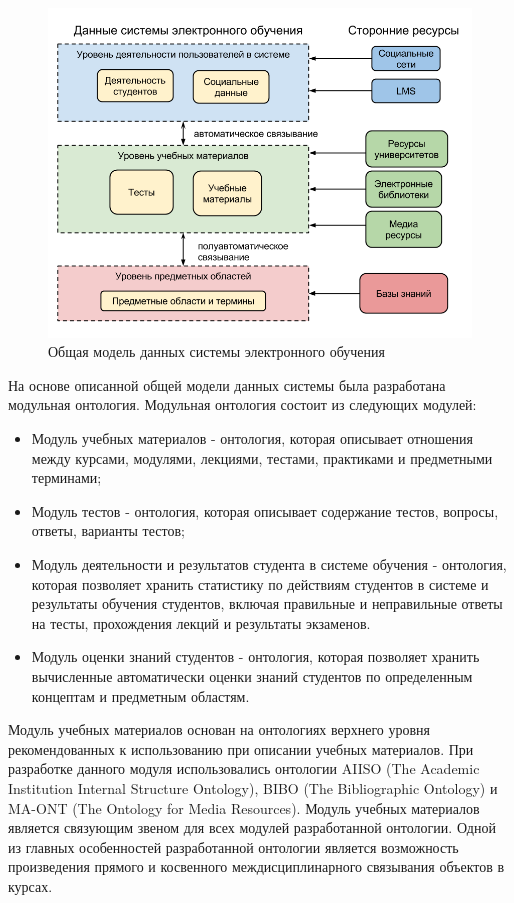 \begin{figure}[ht] 
  \center
  \includegraphics[scale=0.5]{OverallModel}
  \caption{Общая модель данных системы электронного обучения} 
  \label{fig:OverallModel}
\end{figure}

На основе описанной общей модели данных системы была разработана модульная онтология. Модульная онтология состоит из следующих модулей:


\begin{itemize}
\item Модуль учебных материалов - онтология, которая описывает отношения между курсами, модулями, лекциями, тестами, практиками и предметными терминами;
\item Модуль тестов - онтология, которая описывает содержание тестов, вопросы, ответы, варианты тестов;
\item Модуль деятельности и результатов студента в системе обучения - онтология, которая позволяет хранить статистику по действиям студентов в системе и результаты обучения студентов, включая правильные и неправильные ответы на тесты, прохождения лекций и результаты экзаменов.
\item Модуль оценки знаний студентов - онтология, которая позволяет хранить вычисленные автоматически оценки знаний студентов по определенным концептам и предметным областям.
\end{itemize}

Модуль учебных материалов основан на онтологиях верхнего уровня рекомендованных к использованию при описании учебных материалов. При разработке данного модуля использовались онтологии AIISO (The Academic Institution Internal Structure Ontology), BIBO (The Bibliographic Ontology) и MA-ONT (The Ontology for Media Resources). Модуль учебных материалов является связующим звеном для всех модулей разработанной онтологии. Одной из главных особенностей разработанной онтологии является возможность произведения прямого и косвенного междисциплинарного связывания объектов в курсах.   

